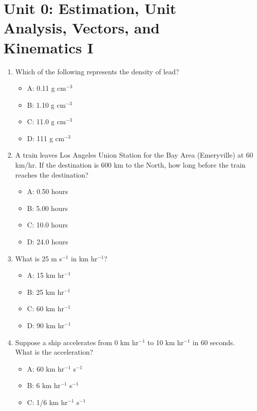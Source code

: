 \documentclass[10pt]{article}
\begin{document}
\twocolumn

\maketitle

\section{Unit 0: Estimation, Unit \\ Analysis, Vectors, and \\ Kinematics I}

\begin{enumerate}
\item Which of the following represents the density of lead?
\begin{itemize}
\item A: 0.11 g cm$^{-3}$
\item B: 1.10 g cm$^{-3}$
\item C: 11.0 g cm$^{-3}$
\item D: 111 g cm$^{-3}$
\end{itemize}
\item A train leaves Los Angeles Union Station for the Bay Area (Emeryville) at 60 km/hr.  If the destination is 600 km to the North, how long before the train reaches the destination?
\begin{itemize}
\item A: 0.50 hours
\item B: 5.00 hours
\item C: 10.0 hours
\item D: 24.0 hours
\end{itemize}
\item What is 25 m s$^{-1}$ in km hr$^{-1}$?
\begin{itemize}
\item A: 15 km hr$^{-1}$
\item B: 25 km hr$^{-1}$
\item C: 60 km hr$^{-1}$
\item D: 90 km hr$^{-1}$
\end{itemize}
\item Suppose a ship accelerates from 0 km hr$^{-1}$ to 10 km hr$^{-1}$ in 60 seconds.  What is the acceleration?
\begin{itemize}
\item A: 60 km hr$^{-1}$ s$^{-1}$
\item B: 6 km hr$^{-1}$ s$^{-1}$
\item C: 1/6 km hr$^{-1}$ s$^{-1}$

\end{itemize}
\end{enumerate}
\end{document}
